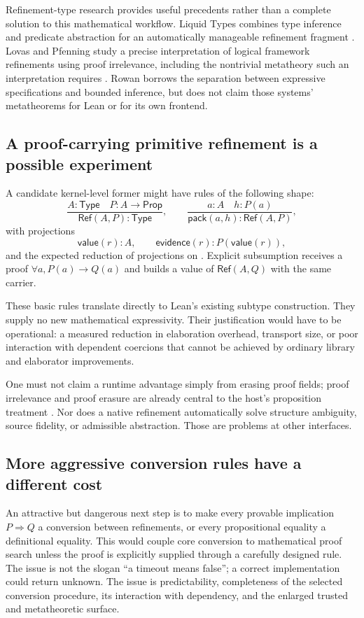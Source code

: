 \documentclass[11pt,letterpaper]{article}
\newcommand{\code}[1]{\texttt{\detokenize{#1}}}
\theoremstyle{definition}\newtheorem{definition}[theorem]{Definition}
\theoremstyle{remark}\newtheorem{remark}[theorem]{Remark}
\begin{document}
Refinement-type research provides useful precedents rather than a complete
solution to this mathematical workflow. Liquid Types combines type inference
and predicate abstraction for an automatically manageable refinement fragment
\cite{liquid}. Lovas and Pfenning study a precise interpretation of logical
framework refinements using proof irrelevance, including the nontrivial
metatheory such an interpretation requires \cite{lfrefinement}. Rowan borrows
the separation between expressive specifications and bounded inference, but
does not claim those systems' metatheorems for Lean or for its own frontend.

\subsection{A proof-carrying primitive refinement is a possible experiment}
A candidate kernel-level former might have rules of the following shape:
\[
 \frac{A:\mathsf{Type}\quad P:A\to\mathsf{Prop}}{\mathsf{Ref}(A,P):\mathsf{Type}},
 \qquad
 \frac{a:A\quad h:P(a)}{\mathsf{pack}(a,h):\mathsf{Ref}(A,P)},
\]
with projections
\[
 \mathsf{value}(r):A,\qquad
 \mathsf{evidence}(r):P(\mathsf{value}(r)),
\]
and the expected reduction of projections on \code{pack}. Explicit
subsumption receives a proof $\forall a,P(a)\to Q(a)$ and builds a value
of $\mathsf{Ref}(A,Q)$ with the same carrier.

These basic rules translate directly to Lean's existing subtype construction.
They supply no new mathematical expressivity. Their justification would have
to be operational: a measured reduction in elaboration overhead, transport
size, or poor interaction with dependent coercions that cannot be achieved
by ordinary library and elaborator improvements.

One must not claim a runtime advantage simply from erasing proof fields;
proof irrelevance and proof erasure are already central to the host's
proposition treatment \cite{lean-type}. Nor does a native refinement automatically solve
structure ambiguity, source fidelity, or admissible abstraction. Those are
problems at other interfaces.

\subsection{More aggressive conversion rules have a different cost}
An attractive but dangerous next step is to make every provable implication
$P\Rightarrow Q$ a conversion between refinements, or every propositional
equality a definitional equality. This would couple core conversion to
mathematical proof search unless the proof is explicitly supplied through a
carefully designed rule. The issue is not the slogan ``a timeout means
false''; a correct implementation could return unknown. The issue is
predictability, completeness of the selected conversion procedure, its
interaction with dependency, and the enlarged trusted and metatheoretic
surface.
\end{document}
